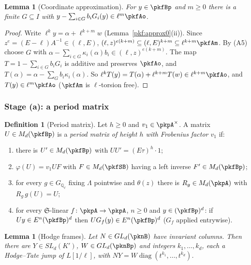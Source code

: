 \documentclass[10pt]{amsart}
\newtheorem{lemma}[theorem]{Lemma}
\theoremstyle{definition}
\newtheorem{definition}[theorem]{Definition}
\theoremstyle{remark}
\newcommand{\Q}{\mathbb Q}
\begin{document}
\begin{lemma}[Coordinate approximation]\label{pkf:coord-approx}
For $y\in\pkfBp$ and $m\ge0$ there is a finite $G\subseteq I$ with $y-\sum_{i\in G}b_iG_i(y)\in
\ell^m\pkfAo$.
\end{lemma}

\begin{proof}
Write $\ell^ky=\alpha+\ell^{k+m}w$ (Lemma~\ref{pkf:approx0}(ii)). Since $z^e=(E-\ell)A^{-1}\in(\ell,E)$,
$(\ell,z)^{e(k+m)}\subseteq(\ell,E)^{k+m}\subseteq\ell^{k+m}\pkfAm$. By (A5) choose $G$ with
$\alpha-\sum_{i\in G}\kappa_i(\alpha)b_i\in(\ell,z)^{e(k+m)}$. The map $T=1-\sum_{i\in G}b_iG_i$ is
additive and preserves $\pkfAo$, and $T(\alpha)=\alpha-\sum_{G}b_i\kappa_i(\alpha)$. So $\ell^kT(y)=
T(\alpha)+\ell^{k+m}T(w)\in\ell^{k+m}\pkfAo$, and $T(y)\in\ell^m\pkfAo$ ($\pkfAm$ is $\ell$-torsion free).
\end{proof}

\subsubsection{Stage (a): a period matrix}\label{pkf:ss-pm}

\begin{definition}[Period matrix]\label{pkf:def-pm}
Let $h\ge0$ and $v_1\in\pkpA^\times$. A matrix $U\in M_d(\pkfBp)$ is a \emph{period matrix of height $h$
with Frobenius factor $v_1$} if:
\begin{enumerate}
\item[(PM1)] there is $U'\in M_d(\pkfBp)$ with $UU'=(E\tau)^h\cdot1$;
\item[(PM2)] $\varphi(U)=v_1UF$ with $F\in M_d(\pkfSB)$ having a left inverse $F'\in M_d(\pkfBp)$;
\item[(PM3)] for every $g\in G_{\Q_\ell}$ fixing $\Lambda$ pointwise and $\theta(z)$ there is $R_g\in
M_d(\pkpA)$ with $R_g\,g(U)=U$;
\item[(PM4)] for every $\mathfrak S$-linear $f\colon\pkpA\to\pkpA$, $n\ge0$ and $y\in(\pkfBp)^d$: if
$Uy\in E^n(\pkfBp)^d$ then $UG_f(y)\in E^n(\pkfBp)^d$ ($G_f$ applied entrywise).
\end{enumerate}
\end{definition}

\begin{lemma}[Hodge frames]\label{pkf:hodge}
Let $N\in GL_d(\pknB)$ have invariant columns. Then there are $Y\in SL_d(K')$, $W\in GL_d(\pknBp)$ and
integers $k_1,\dots,k_d$, each a Hodge--Tate jump of $L[1/\ell]$, with $NY=W\operatorname{diag}
(t^{k_1},\dots,t^{k_d})$.
\end{lemma}
\end{document}
